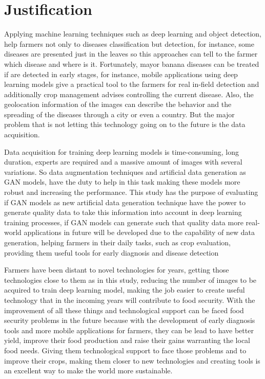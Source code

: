 \chapter{Justification} %
\label{Chapter4}

Applying machine learning techniques such as deep learning and object detection, help farmers not only to diseases classification but detection, for instance, some diseases are presented just in the leaves so this approaches can tell to the farmer which disease and where is it. Fortunately, mayor banana diseases can be treated if are detected in early stages, for instance, mobile applications using deep learning models give a practical tool to the farmers for real in-field detection and additionally crop management advises controlling the current disease. Also, the geolocation information of the images can describe the behavior and the spreading of the diseases through a city or even a country. But the major problem that is not letting this technology going on to the future is the data acquisition. 

Data acquisition for training deep learning models is time-consuming, long duration, experts are required and a massive amount of images with several variations. So data augmentation techniques and artificial data generation as GAN models, have the duty to help in this task making these models more robust and increasing the performance. This study has the purpose of evaluating if GAN models as new artificial data generation technique have the power to generate quality data to take this information into account in deep learning training processes, if GAN models can generate such that quality data more real-world applications in future will be developed due to the capability of new data generation, helping farmers in their daily tasks, such as crop evaluation, providing them useful tools for early diagnosis and disease detection

Farmers have been distant to novel technologies for years, getting those technologies close to them as in this study, reducing the number of images to be acquired to train deep learning model, making the job easier to create useful technology that in the incoming years will contribute to food security.
With the improvement of all these things and technological support can be faced food security problems in the future because with the development of early diagnosis tools and more mobile applications for farmers, they can be lead to have better yield, improve their food production and raise their gains warranting the local food needs. Giving them technological support to face those problems and to improve their crops, making them closer to new technologies and creating tools is an excellent way to make the world more sustainable.